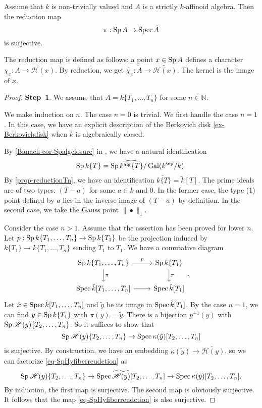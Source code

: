 \begin{lemma}\label{lma-nongradedredsurj}
    Assume that $k$ is non-trivially valued and $A$ is a strictly $k$-affinoid algebra. Then the reduction map 
    \[
        \pi:\operatorname{Sp} A\rightarrow \operatorname{Spec} \tilde{A}  
    \]
    is surjective.
\end{lemma}
The reduction map is defined as follows: a point $x\in \operatorname{Sp} A$ defines a character $\chi_x:A\rightarrow \mathscr{H}(x)$. By reduction, we get $\tilde{\chi_x}:\tilde{A}\rightarrow \widetilde{\mathscr{H}(x)}$. The kernel is the image of $x$.
\begin{proof}
    \textbf{Step~1}. We assume that $A=k\{T_1,\ldots,T_n\}$ for some $n\in \mathbb{N}$. 

    We make induction on $n$. The case $n=0$ is trivial. 
    We first handle the case $n=1$. In this case, we have an explicit description of the Berkovich disk \cref{ex-Berkovichdisk} when $k$ is algebraically closed. 

    By \cref{Banach-cor-Spalgclosure} in , we have a natural identification 
    \[
        \operatorname{Sp} k\{T\}=\operatorname{Sp} \widehat{k^{\mathrm{alg}}\{T\}}/\operatorname{Gal}(k^{\mathrm{sep}}/k).  
    \]
    By \cref{prop-reductionTn}, we have an identification $\widetilde{k\{T\}}=\tilde{k}[T]$. The prime ideals are of two types: $(T-a)$ for some $a\in k$ and $0$. In the former case, the type (1) point defined by $a$ lies in the inverse image of $(T-a)$ by definition. In the second case, we take the Gauss point $\|\bullet\|_1$.
    
    Consider the case $n>1$. Assume that the assertion has been proved for lower $n$.
    Let $p: \operatorname{Sp} k\{T_1,\ldots,T_n\}\rightarrow \operatorname{Sp} k\{T_1\}$ be the projection induced by $k\{T_1\}\rightarrow k\{T_1,\ldots,T_n\}$ sending $T_1$ to $T_1$. We have a comutative diagram
    \[
        \begin{tikzcd}
            \Sp k\{T_1,\ldots,T_n\} \arrow[d, "\pi"] \arrow[r,"p"] & \Sp k\{T_1\} \arrow[d, "\pi"] \\
            \Spec \tilde{k}[T_1,\ldots,T_n] \arrow[r]      & \Spec \tilde{k}[T_1]
        \end{tikzcd}.  
    \]
    Let $\tilde{x}\in \operatorname{Spec} \tilde{k}[T_1,\ldots,T_n]$ and $\tilde{y}$ be its image in $\operatorname{Spec} \tilde{k}[T_1]$. By the case $n=1$, we can find $y\in \operatorname{Sp} k\{T_1\}$ with $\pi(y)=\tilde{y}$. There is a bijection $p^{-1}(y)$ with $\operatorname{Sp} \mathscr{H}(y)\{T_2,\ldots,T_n\}$. So it suffices to show that 
    \begin{equation}\label{eq-SpHyfiberreudction}
        \operatorname{Sp} \mathscr{H}(y)\{T_2,\ldots,T_n\}\rightarrow \operatorname{Spec} \kappa(\tilde{y})[T_2,\ldots,T_n]
    \end{equation}
    is surjective. By construction, we have an embedding $\kappa(\tilde{y})\rightarrow \widetilde{\mathscr{H}(y)}$, so we can factorize \eqref{eq-SpHyfiberreudction} as
    \[
        \operatorname{Sp} \mathscr{H}(y)\{T_2,\ldots,T_n\}\rightarrow \operatorname{Spec} \widetilde{\mathscr{H}(y)}[T_2,\ldots,T_n]\rightarrow \operatorname{Spec} \kappa(\tilde{y})[T_2,\ldots,T_n].
    \]
    By induction, the first map is surjective. The second map is obviously surjective. It follows that the map \eqref{eq-SpHyfiberreudction} is also surjective.


\end{proof}
